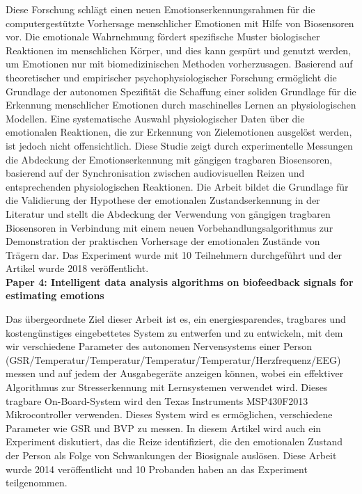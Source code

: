 Diese Forschung schlägt einen neuen Emotionserkennungsrahmen für die computergestützte Vorhersage menschlicher Emotionen mit Hilfe von Biosensoren vor. 
Die emotionale Wahrnehmung fördert spezifische Muster biologischer Reaktionen im menschlichen Körper, und dies kann gespürt und genutzt werden, um Emotionen nur mit biomedizinischen Methoden vorherzusagen. 
Basierend auf theoretischer und empirischer psychophysiologischer Forschung ermöglicht die Grundlage der autonomen Spezifität die Schaffung einer soliden Grundlage für die Erkennung menschlicher Emotionen durch maschinelles Lernen an physiologischen Modellen. 
Eine systematische Auswahl physiologischer Daten über die emotionalen Reaktionen, die zur Erkennung von Zielemotionen ausgelöst werden, ist jedoch nicht offensichtlich. 
Diese Studie zeigt durch experimentelle Messungen die Abdeckung der Emotionserkennung mit gängigen tragbaren Biosensoren, basierend auf der Synchronisation zwischen audiovisuellen Reizen und entsprechenden physiologischen Reaktionen. 
Die Arbeit bildet die Grundlage für die Validierung der Hypothese der emotionalen Zustandserkennung in der Literatur und stellt die Abdeckung der Verwendung von gängigen tragbaren Biosensoren in Verbindung mit einem neuen Vorbehandlungsalgorithmus zur Demonstration der praktischen Vorhersage der emotionalen Zustände von Trägern dar. 
Das Experiment wurde mit 10 Teilnehmern durchgeführt und der Artikel wurde 2018 veröffentlicht. \\


\textbf{Paper 4: Intelligent data analysis algorithms on biofeedback signals for estimating emotions}

 Das übergeordnete Ziel dieser Arbeit ist es, ein energiesparendes, tragbares und kostengünstiges eingebettetes System zu entwerfen und zu entwickeln, mit dem wir verschiedene Parameter des autonomen Nervensystems einer Person (GSR/Temperatur/Temperatur/Temperatur/Temperatur/Herzfrequenz/EEG) messen und auf jedem der Ausgabegeräte anzeigen können, wobei ein effektiver Algorithmus zur Stresserkennung mit Lernsystemen verwendet wird. 
 Dieses tragbare On-Board-System wird den Texas Instruments MSP430F2013 Mikrocontroller verwenden. 
 Dieses System wird es ermöglichen, verschiedene Parameter wie GSR und BVP zu messen. 
 In diesem Artikel wird auch ein Experiment diskutiert, das die Reize identifiziert, die den emotionalen Zustand der Person als Folge von Schwankungen der Biosignale auslösen. 
 Diese Arbeit wurde 2014 veröffentlicht und 10 Probanden haben an das Experiment teilgenommen. \\


